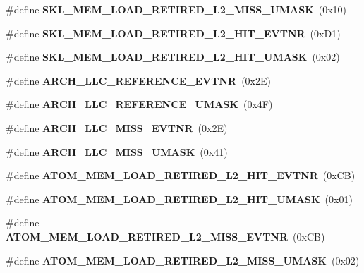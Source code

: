 \begin{DoxyCompactItemize}
\mbox{\label{types_8h_a15e2d3230e4bc258e98b6402ec979604}} 
\#define {\bfseries S\+K\+L\+\_\+\+M\+E\+M\+\_\+\+L\+O\+A\+D\+\_\+\+R\+E\+T\+I\+R\+E\+D\+\_\+\+L2\+\_\+\+M\+I\+S\+S\+\_\+\+U\+M\+A\+SK}~(0x10)
\item 
\mbox{\label{types_8h_ae76cffc977414878e4679418e2a111ac}} 
\#define {\bfseries S\+K\+L\+\_\+\+M\+E\+M\+\_\+\+L\+O\+A\+D\+\_\+\+R\+E\+T\+I\+R\+E\+D\+\_\+\+L2\+\_\+\+H\+I\+T\+\_\+\+E\+V\+T\+NR}~(0x\+D1)
\item 
\mbox{\label{types_8h_a702e0ea81d8768b347fc48d7cbd7a1e7}} 
\#define {\bfseries S\+K\+L\+\_\+\+M\+E\+M\+\_\+\+L\+O\+A\+D\+\_\+\+R\+E\+T\+I\+R\+E\+D\+\_\+\+L2\+\_\+\+H\+I\+T\+\_\+\+U\+M\+A\+SK}~(0x02)
\item 
\mbox{\label{types_8h_a833581dd45657cb5f0a43d4a0bea3303}} 
\#define {\bfseries A\+R\+C\+H\+\_\+\+L\+L\+C\+\_\+\+R\+E\+F\+E\+R\+E\+N\+C\+E\+\_\+\+E\+V\+T\+NR}~(0x2\+E)
\item 
\mbox{\label{types_8h_a814bebc63a979bfe25932aec1e4f3e65}} 
\#define {\bfseries A\+R\+C\+H\+\_\+\+L\+L\+C\+\_\+\+R\+E\+F\+E\+R\+E\+N\+C\+E\+\_\+\+U\+M\+A\+SK}~(0x4\+F)
\item 
\mbox{\label{types_8h_a557e0af84a53fe702dbf6c426f01a430}} 
\#define {\bfseries A\+R\+C\+H\+\_\+\+L\+L\+C\+\_\+\+M\+I\+S\+S\+\_\+\+E\+V\+T\+NR}~(0x2\+E)
\item 
\mbox{\label{types_8h_a9844e9cf0b1be6e377394aa0f36c0cc9}} 
\#define {\bfseries A\+R\+C\+H\+\_\+\+L\+L\+C\+\_\+\+M\+I\+S\+S\+\_\+\+U\+M\+A\+SK}~(0x41)
\item 
\mbox{\label{types_8h_ae22b6f56994cf7ace060db72ae78ed02}} 
\#define {\bfseries A\+T\+O\+M\+\_\+\+M\+E\+M\+\_\+\+L\+O\+A\+D\+\_\+\+R\+E\+T\+I\+R\+E\+D\+\_\+\+L2\+\_\+\+H\+I\+T\+\_\+\+E\+V\+T\+NR}~(0x\+C\+B)
\item 
\mbox{\label{types_8h_a692622a84797600e7b04df9a1eacc475}} 
\#define {\bfseries A\+T\+O\+M\+\_\+\+M\+E\+M\+\_\+\+L\+O\+A\+D\+\_\+\+R\+E\+T\+I\+R\+E\+D\+\_\+\+L2\+\_\+\+H\+I\+T\+\_\+\+U\+M\+A\+SK}~(0x01)
\item 
\mbox{\label{types_8h_a3c0d272f11177100e9b18f3772efe0e2}} 
\#define {\bfseries A\+T\+O\+M\+\_\+\+M\+E\+M\+\_\+\+L\+O\+A\+D\+\_\+\+R\+E\+T\+I\+R\+E\+D\+\_\+\+L2\+\_\+\+M\+I\+S\+S\+\_\+\+E\+V\+T\+NR}~(0x\+C\+B)
\item 
\mbox{\label{types_8h_a61f57e34652a6d1477797b48401801da}} 
\#define {\bfseries A\+T\+O\+M\+\_\+\+M\+E\+M\+\_\+\+L\+O\+A\+D\+\_\+\+R\+E\+T\+I\+R\+E\+D\+\_\+\+L2\+\_\+\+M\+I\+S\+S\+\_\+\+U\+M\+A\+SK}~(0x02)
\item 
\mbox{\label{types_8h_ae22b6f56994cf7ace060db72ae78ed02}} 

\end{DoxyCompactItemize}
